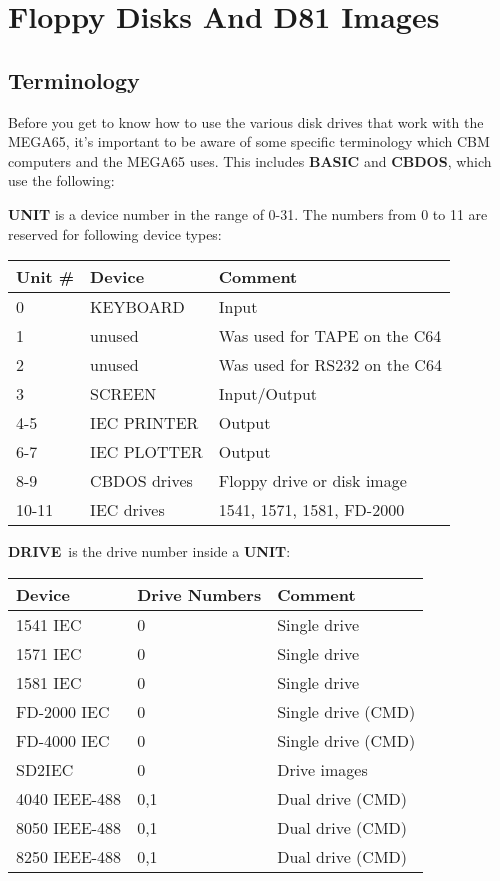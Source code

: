\chapter{Floppy Disks And D81 Images}
\label{cha:freezer}


\section{Terminology}
Before you get to know how to use the various disk drives that work with the MEGA65, it's important to be aware
of some specific terminology which CBM computers and the MEGA65 uses. This includes {\bf BASIC} and {\bf CBDOS},
which use the following:

{\bf UNIT} is a device number in the range of 0-31.
The numbers from 0 to 11 are reserved for following device types:

\setlength{\tabcolsep}{1mm}
\begin{center}
\begin{tabular}{|l|l|l|}
\hline
{\bf Unit} \# & {\bf Device}  & {\bf Comment} \\
\hline
0        & KEYBOARD & Input \\
1        & unused   & Was used for TAPE on the C64 \\
2        & unused   & Was used for RS232 on the C64 \\
3        & SCREEN   & Input/Output     \\
4-5      & IEC PRINTER  & Output     \\
6-7      & IEC PLOTTER  & Output     \\
8-9      & CBDOS drives & Floppy drive or disk image \\
10-11    & IEC drives   & 1541, 1571, 1581, FD-2000 \\
\hline
\end{tabular}
\end{center}

{\bf DRIVE} is the drive number inside a {\bf UNIT}:

\setlength{\tabcolsep}{1mm}
\begin{center}
\begin{tabular}{|l|l|l|}
\hline
{\bf Device}  & {\bf Drive Numbers} & {\bf Comment} \\
\hline
1541 IEC & 0             & Single drive \\
1571 IEC & 0             & Single drive \\
1581 IEC & 0             & Single drive \\
FD-2000 IEC & 0             & Single drive (CMD)\\
FD-4000 IEC & 0             & Single drive (CMD)\\
SD2IEC      & 0             & Drive images\\
4040 IEEE-488 & 0,1             & Dual drive (CMD)\\
8050 IEEE-488 & 0,1             & Dual drive (CMD)\\
8250 IEEE-488 & 0,1             & Dual drive (CMD)\\
\hline
\end{tabular}
\end{center}

